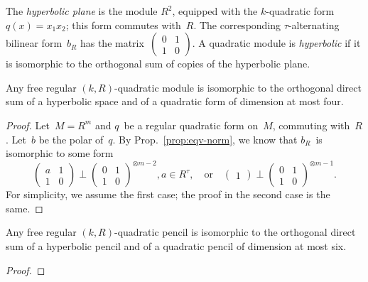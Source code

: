 \documentclass{article}
\def\mat#1{\begin{pmatrix}#1\end{pmatrix}}
\def\F{\mathbb{F}}
\begin{document}
The \emph{hyperbolic plane} is the module $R^2$, equipped with the
$k$-quadratic form~$q(x) = x_1 x_2$; this form commutes with~$R$. The
corresponding $τ$-alternating bilinear form~$b_R$ has the
matrix~$\mat{0&1\\1&0}$. A quadratic module is \emph{hyperbolic} if it is
isomorphic to the orthogonal sum of copies of the hyperbolic plane.

\begin{prop}
Any free regular $(k, R)$-quadratic module is isomorphic
to the orthogonal direct sum of a hyperbolic space and of a quadratic form
of dimension at most four.
\end{prop}

\begin{proof}
Let~$M = R^m$ and $q$~be a regular quadratic form on~$M$, commuting
with~$R$. Let~$b$ be the polar of~$q$. By Prop.~\ref{prop:eqv-norm}, we
know that $b_R$~is isomorphic to some form
\begin{equation}
\mat{a & 1\\1 & 0} ⟂ \mat{0 & 1\\1 & 0}^{⊗m-2}, a ∈ R^{τ}, \quad\text{or}\quad
\mat{1} ⟂ \mat{0&1\\1&0}^{⊗m-1}.
\end{equation}
For simplicity, we assume the first case; the proof in the second case is
the same.
\end{proof}


\begin{prop}
Any free regular $(k, R)$-quadratic pencil is isomorphic to the
orthogonal direct sum of a hyperbolic pencil and of a quadratic pencil of
dimension at most six.
\end{prop}


\begin{proof}
\end{proof}


% 
% 
% 
% 
\end{document}
